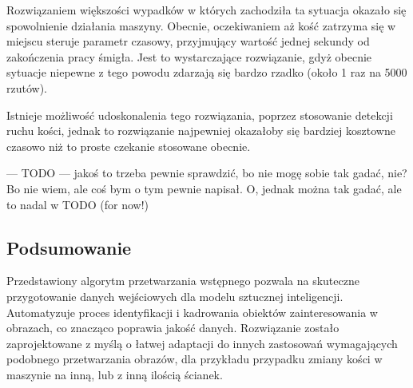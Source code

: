 Rozwiązaniem większości wypadków w których zachodziła ta sytuacja okazało się spowolnienie działania maszyny.
Obecnie, oczekiwaniem aż kość zatrzyma się w miejscu steruje parametr czasowy, przyjmujący wartość jednej sekundy od zakończenia pracy śmigła.
Jest to wystarczające rozwiązanie, gdyż obecnie sytuacje niepewne z tego powodu zdarzają się bardzo rzadko (około 1 raz na 5000 rzutów).

Istnieje możliwość udoskonalenia tego rozwiązania, poprzez stosowanie detekcji ruchu kości,
jednak to rozwiązanie najpewniej okazałoby się bardziej kosztowne czasowo niż to proste czekanie stosowane obecnie.


--- TODO ---
jakoś to trzeba pewnie sprawdzić, bo nie mogę sobie tak gadać, nie?
Bo nie wiem, ale coś bym o tym pewnie napisał.
O, jednak można tak gadać, ale to nadal w TODO (for now!)



\subsection{Podsumowanie}

Przedstawiony algorytm przetwarzania wstępnego pozwala na skuteczne przygotowanie danych wejściowych dla modelu sztucznej inteligencji.
Automatyzuje proces identyfikacji i kadrowania obiektów zainteresowania w obrazach, co znacząco poprawia jakość danych.
Rozwiązanie zostało zaprojektowane z myślą o łatwej adaptacji do innych zastosowań wymagających podobnego przetwarzania obrazów,
dla przykładu przypadku zmiany kości w maszynie na inną, lub z inną ilością ścianek.

